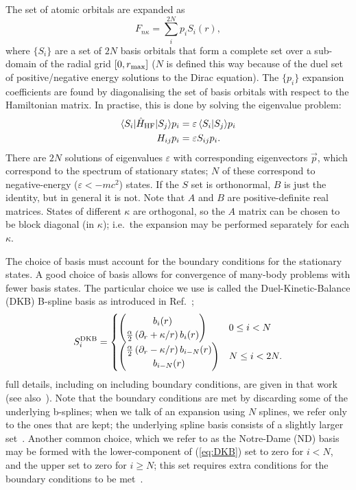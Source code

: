 \documentclass[10pt,twocolumn,a4paper]{article}%
\newcommand{\bra}[1]{\ensuremath{\langle #1|}}	%
\newcommand{\ket}[1]{\ensuremath{|#1\rangle}}	%
\newcommand{\braket}[1]{\ensuremath{\langle #1\rangle}}	%
\newcommand{\twocomp}[2]{\ensuremath{\begin{pmatrix}#1\\#2\end{pmatrix}}}	%
\newcommand{\be}{\begin{equation}}
\newcommand{\ee}{\end{equation}}
\def\en{\ensuremath{\varepsilon}}
\def\p{\ensuremath{\partial}}
\renewcommand{\k}{\ensuremath{\kappa}}
\begin{document}
The set of atomic orbitals are expanded as
\be
F_{n\k} = \sum_i^{2N} p_i S_i(r),
\ee
where $\{S_i\}$ are a set of $2N$ basis orbitals that form a complete set over a sub-domain of the radial grid $[0,r_{\rm max}]$ ($N$ is defined this way because of the duel set of positive/negative energy solutions to the Dirac equation).
The $\{p_i\}$ expansion coefficients are found by diagonalising the set of basis orbitals with respect to the Hamiltonian matrix.
In practise, this is done by solving the eigenvalue problem:
%
\begin{align}\label{eq:Hij-splines}
\bra{S_i}\hat H_{\rm HF}\ket{S_j} p_i &= \en\,\braket{S_i|S_j} p_i\\
H_{ij}p_i &= \en S_{ij}p_i.
\end{align}
%
There are $2N$ solutions of eigenvalues $\en$ with corresponding eigenvectors $\vec{p}$, which correspond to the spectrum of stationary states; $N$ of these correspond to negative-energy ($\en<-mc^2$) states.
If the $S$ set is orthonormal, $B$ is just the identity, but in general it is not.
Note that $A$ and $B$ are positive-definite real matrices.
States of different $\k$ are orthogonal, so the $A$ matrix can be chosen to be block diagonal (in $\k$); i.e.\ the expansion may be performed separately for each $\kappa$. %







The choice of basis must account for the boundary conditions for the stationary states.
A good choice of basis allows for convergence of many-body problems with fewer basis states.
The particular choice we use is called the Duel-Kinetic-Balance (DKB) B-spline basis as introduced in Ref.~\cite{Beloy2008};
\be\label{eq:DKB}
S_i^{\rm DKB}= \begin{cases}
\twocomp{b_i(r)}{\frac{\alpha}{2}\left(\p_r+\kappa/r\right)b_i(r)}  &  0\leq i<N \\
\twocomp{\frac{\alpha}{2}\left(\p_r-\kappa/r\right)b_{i-N}(r)}{b_{i-N}(r)}   & N\leq i<2N.
\end{cases}
\ee
full details, including on including boundary conditions, 
are given in that work (see also~\cite{Johnson1988,AMBiT2018}).
Note that the boundary conditions are met by discarding some of the underlying b-splines; when we talk of an expansion using $N$ splines, we refer only to the ones that are kept; the underlying spline basis consists of a slightly larger set~\cite{Beloy2008}.
Another common choice, which we refer to as the Notre-Dame (ND) basis~\cite{Johnson1988} may be formed with the lower-component of (\ref{eq:DKB}) set to zero for $i<N$, and the upper set to zero for $i\geq N$; this set requires extra conditions for the boundary conditions to be met~\cite{Johnson1988}.
\end{document}
